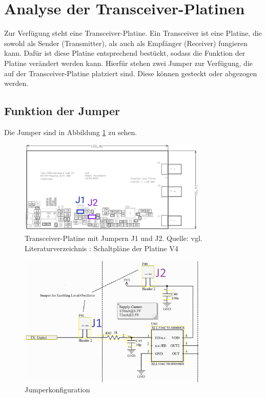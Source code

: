 \section{Analyse der Transceiver-Platinen}
Zur Verfügung steht eine Transceiver-Platine. Ein Transceiver ist eine Platine, die sowohl als Sender (Transmitter), als auch als Empfänger (Receiver) fungieren kann. Dafür ist diese Platine entsprechend bestückt, sodass die Funktion der Platine verändert werden kann. 
Hierfür stehen zwei Jumper zur Verfügung, die auf der Transceiver-Platine platziert sind. Diese können gesteckt oder abgezogen werden.
\subsection{Funktion der Jumper}
Die Jumper sind in Abbildung \ref{fig:Tranceiver-Platine} zu sehen.
\begin{figure}[H]
    \centering
    \includegraphics[width=0.8\textwidth]{Pictures/Jumper.jpg}
    \caption{Transceiver-Platine mit Jumpern J1 und J2. Quelle: vgl. Literaturverzeichnis \cite{SchaltplanPCBV4}: Schaltpläne der Platine V4}
    \label{fig:Tranceiver-Platine}
\end{figure}
\begin{figure}[H]
    \centering
    \includegraphics[width=0.8\textwidth]{Pictures/JumperSchaltung.png}
    \caption{Jumperkonfiguration}
    \label{fig:Jumper}
\end{figure}
